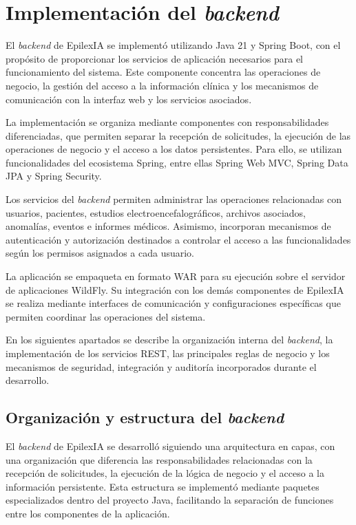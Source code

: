 \section{Implementación del \textit{backend}}

El \textit{backend} de EpilexIA se implementó utilizando Java 21
y Spring Boot, con el propósito de proporcionar los
servicios de aplicación necesarios para el funcionamiento
del sistema. Este componente concentra las operaciones
de negocio, la gestión del acceso a la información
clínica y los mecanismos de comunicación con la
interfaz web y los servicios asociados.

La implementación se organiza mediante componentes
con responsabilidades diferenciadas, que permiten
separar la recepción de solicitudes, la ejecución
de las operaciones de negocio y el acceso a los
datos persistentes. Para ello, se utilizan
funcionalidades del ecosistema Spring, entre ellas
Spring Web MVC, Spring Data JPA y Spring Security.

Los servicios del \textit{backend} permiten administrar
las operaciones relacionadas con usuarios,
pacientes, estudios electroencefalográficos,
archivos asociados, anomalías, eventos e informes
médicos. Asimismo, incorporan mecanismos de
autenticación y autorización destinados a
controlar el acceso a las funcionalidades
según los permisos asignados a cada usuario.

La aplicación se empaqueta en formato WAR para
su ejecución sobre el servidor de aplicaciones
WildFly. Su integración con los demás componentes
de EpilexIA se realiza mediante interfaces de
comunicación y configuraciones específicas
que permiten coordinar las operaciones del sistema.

En los siguientes apartados se describe la
organización interna del \textit{backend}, la implementación
de los servicios REST, las principales reglas
de negocio y los mecanismos de seguridad,
integración y auditoría incorporados durante
el desarrollo.


\subsection{Organización y estructura del \textit{backend}}

El \textit{backend} de EpilexIA se desarrolló siguiendo una
arquitectura en capas, con una organización que
diferencia las responsabilidades relacionadas con
la recepción de solicitudes, la ejecución de la
lógica de negocio y el acceso a la información
persistente. Esta estructura se implementó mediante
paquetes especializados dentro del proyecto Java,
facilitando la separación de funciones entre los
componentes de la aplicación.

